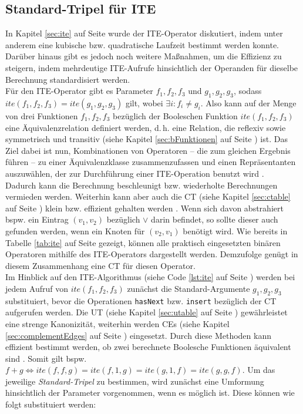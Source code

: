 \subsection{Standard-Tripel für ITE}
\label{sec:standard}
In Kapitel \ref{sec:ite} auf Seite \pageref{sec:ite} wurde der ITE-Operator diskutiert, indem unter anderem eine kubische bzw. quadratische Laufzeit bestimmt werden konnte. Darüber hinaus gibt es jedoch noch weitere Maßnahmen, um die Effizienz zu steigern, indem mehrdeutige ITE-Aufrufe hinsichtlich der Operanden für dieselbe Berechnung standardisiert werden.\\
Für den ITE-Operator gibt es Parameter $f_1, f_2, f_3$ und $g_1,g_2,g_3$, sodass $ite(f_1, f_2, f_3) = ite(g_1,g_2,g_3)$ gilt, wobei $\exists i : f_i \neq g_i$. Also kann auf der Menge von drei Funktionen $f_1, f_2, f_3$ bezüglich der Booleschen Funktion $ite(f_1, f_2, f_3)$ eine Äquivalenzrelation definiert werden, d.\,h. eine Relation, die reflexiv sowie symmetrisch und transitiv (siehe Kapitel \ref{sec:bFunktionen} auf Seite \pageref{sec:bFunktionen}) ist. Das Ziel dabei ist nun, Kombinationen von Operatoren -- die zum gleichen Ergebnis führen -- zu einer Äquivalenzklasse zusammenzufassen und einen Repräsentanten auszuwählen, der zur Durchführung einer ITE-Operation benutzt wird \cite[S.40]{h2002}.\\
Dadurch kann die Berechnung beschleunigt bzw. wiederholte Berechnungen vermieden werden. Weiterhin kann aber auch die CT (siehe Kapitel \ref{sec:ctable} auf Seite \pageref{sec:ctable}) klein bzw. effizient gehalten werden \cite[S.48]{s2007}. Wenn sich davon abstrahiert bspw. ein Eintrag $(v_1,v_2)$ bezüglich $\vee$ darin befindet, so sollte dieser auch gefunden werden, wenn ein Knoten für $(v_2,v_1)$ benötigt wird. Wie bereits in Tabelle \ref{tab:ite} auf Seite \pageref{tab:ite} gezeigt, können alle praktisch eingesetzten binären Operatoren mithilfe des ITE-Operators dargestellt werden. Demzufolge genügt in diesem Zusammenhang eine CT für diesen Operator.\\
Im Hinblick auf den ITE-Algorithmus (siehe Code \ref{lst:ite} auf Seite \pageref{lst:ite}) werden bei jedem Aufruf von $ite(f_1,f_2,f_3)$ zunächst die Standard-Argumente $g_1, g_2, g_3$ substituiert, bevor die Operationen \texttt{hasNext} bzw. \texttt{insert} bezüglich der CT aufgerufen werden. Die UT (siehe Kapitel \ref{sec:utable} auf Seite \pageref{sec:utable}) gewährleistet eine strenge Kanonizität, weiterhin werden CEs (siehe Kapitel \ref{sec:complementEdges} auf Seite \pageref{sec:complementEdges}) eingesetzt. Durch diese Methoden kann effizient bestimmt werden, ob zwei berechnete Boolesche Funktionen äquivalent sind \cite{brb2007}. Somit gilt bspw. $f + g \Leftrightarrow ite(f,f,g) = ite(f,1,g) = ite(g,1,f) = ite(g,g,f)$. Um das jeweilige \emph{Standard-Tripel} zu bestimmen, wird zunächst eine Umformung hinsichtlich der Parameter vorgenommen, wenn es möglich ist. Diese können wie folgt substituiert werden:
